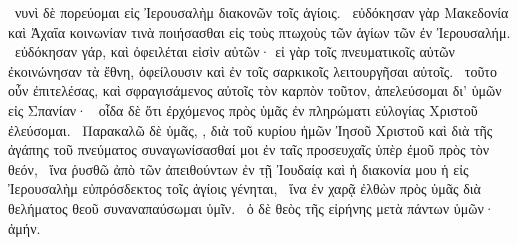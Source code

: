 ~νυνὶ δὲ πορεύομαι εἰς Ἰερουσαλὴμ διακονῶν τοῖς ἁγίοις.
~εὐδόκησαν γὰρ Μακεδονία καὶ Ἀχαΐα κοινωνίαν τινὰ ποιήσασθαι εἰς τοὺς πτωχοὺς τῶν ἁγίων τῶν ἐν Ἰερουσαλήμ.
~εὐδόκησαν γάρ, καὶ ὀφειλέται εἰσὶν αὐτῶν· εἰ γὰρ τοῖς πνευματικοῖς αὐτῶν ἐκοινώνησαν τὰ ἔθνη, ὀφείλουσιν καὶ ἐν τοῖς σαρκικοῖς λειτουργῆσαι αὐτοῖς.
~τοῦτο οὖν ἐπιτελέσας, καὶ σφραγισάμενος αὐτοῖς τὸν καρπὸν τοῦτον, ἀπελεύσομαι δι’ ὑμῶν εἰς Σπανίαν·
~οἶδα δὲ ὅτι ἐρχόμενος πρὸς ὑμᾶς ἐν πληρώματι εὐλογίας Χριστοῦ ἐλεύσομαι.
~Παρακαλῶ δὲ ὑμᾶς, , διὰ τοῦ κυρίου ἡμῶν Ἰησοῦ Χριστοῦ καὶ διὰ τῆς ἀγάπης τοῦ πνεύματος συναγωνίσασθαί μοι ἐν ταῖς προσευχαῖς ὑπὲρ ἐμοῦ πρὸς τὸν θεόν,
~ἵνα ῥυσθῶ ἀπὸ τῶν ἀπειθούντων ἐν τῇ Ἰουδαίᾳ καὶ ἡ διακονία μου ἡ εἰς Ἰερουσαλὴμ εὐπρόσδεκτος τοῖς ἁγίοις γένηται,
~ἵνα ἐν χαρᾷ ἐλθὼν πρὸς ὑμᾶς διὰ θελήματος θεοῦ συναναπαύσωμαι ὑμῖν.
~ὁ δὲ θεὸς τῆς εἰρήνης μετὰ πάντων ὑμῶν· ἀμήν.

